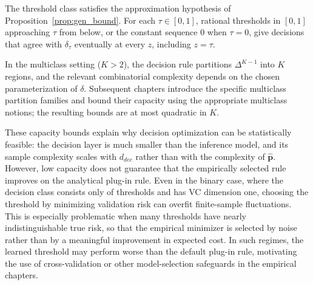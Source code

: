 The threshold class satisfies the approximation hypothesis of Proposition~\ref{prop:gen_bound}. For each $\tau \in [0,1]$, rational thresholds in $[0,1]$ approaching $\tau$ from below, or the constant sequence $0$ when $\tau = 0$, give decisions that agree with $\delta_\tau$ eventually at every $z$, including $z = \tau$.

In the multiclass setting ($K>2$), the decision rule partitions $\Delta^{K-1}$ into $K$ regions, and the relevant combinatorial complexity depends on the chosen parameterization of $\delta$. Subsequent chapters introduce the specific multiclass partition families and bound their capacity using the appropriate multiclass notions; the resulting bounds are at most quadratic in $K$.

These capacity bounds explain why decision optimization can be statistically feasible: the decision layer is much smaller than the inference model, and its sample complexity scales with $d_{dec}$ rather than with the complexity of $\hat{\mathbf{p}}$. However, low capacity does not guarantee that the empirically selected rule improves on the analytical plug-in rule. Even in the binary case, where the decision class consists only of thresholds and has VC dimension one, choosing the threshold by minimizing validation risk can overfit finite-sample fluctuations. This is especially problematic when many thresholds have nearly indistinguishable true risk, so that the empirical minimizer is selected by noise rather than by a meaningful improvement in expected cost. In such regimes, the learned threshold may perform worse than the default plug-in rule, motivating the use of cross-validation or other model-selection safeguards in the empirical chapters.
